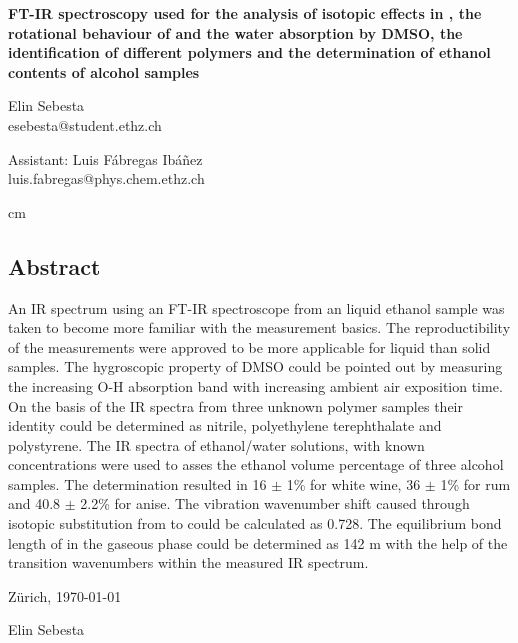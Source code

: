 \documentclass[a4paper,abstracton]{article}	                       %
\newcommand*\wildcard[2][5cm]{\vspace*{0cm}\parbox{#1}{\hrulefill\par#2}} %
\begin{document}

\begin{titlepage}
\thispagestyle{fancy} 
\renewcommand{\headrulewidth}{0.5pt}


	\begin{center}
 	\huge \textbf{FT-IR spectroscopy used for the analysis of isotopic effects in , the rotational behaviour of  and the water absorption by DMSO, the identification of different polymers and the determination of ethanol contents of alcohol samples}
 	\vskip 1cm
	\end{center}
	
\begin{minipage}[t]{.49\linewidth}
\begin{center}
\large {Elin Sebesta} \\
\large {esebesta@student.ethz.ch}\\
\end{center}
\end{minipage}
\begin{minipage}[t]{.49\linewidth}
\begin{center}
\large Assistant: Luis F\'abregas Ib\'a\~nez\\
\large luis.fabregas@phys.chem.ethz.ch
\end{center}
\end{minipage}

 cm

 \subsection*{Abstract}
An IR spectrum using an FT-IR spectroscope from an liquid ethanol sample was taken to become more familiar with the measurement basics. The reproductibility of the measurements were approved to be more applicable for liquid than solid samples. The hygroscopic property of DMSO could be pointed out by measuring the increasing O-H absorption band with increasing ambient air exposition time. On the basis of the IR spectra from three unknown polymer samples their identity could be determined as nitrile, polyethylene terephthalate and polystyrene. The IR spectra of ethanol/water solutions, with known concentrations were used to asses the ethanol volume percentage of three alcohol samples. The determination resulted in 16 $\pm$ 1\% for white wine, 36 $\pm$ 1\% for rum and 40.8 $\pm$ 2.2\% for anise. The vibration wavenumber shift caused through isotopic substitution from  to  could be calculated as 0.728. The equilibrium bond length of  in the gaseous phase could be determined as 142 \p m with the help of the transition wavenumbers within the measured IR spectrum. 

\vfill
	
	
Z\"urich,  \today
\hspace{\fill}
\begingroup
  \wildcard{Elin Sebesta}
\endgroup


\end{titlepage}
\end{document}
